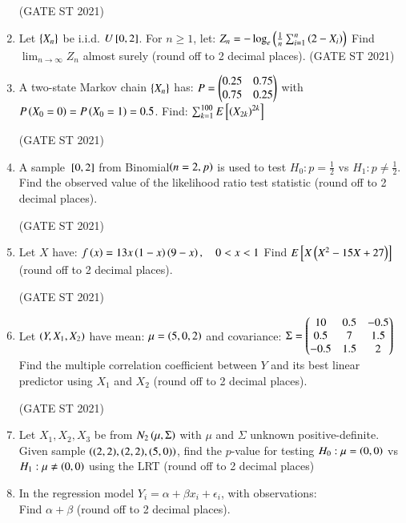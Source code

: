 \documentclass[journal,12pt,onecolumn]{IEEEtran}
\theoremstyle{remark}
\begin{document}
\begin{enumerate}
\hfill (GATE ST 2021) \\

\item
Let $\left\{X_n\right\}$ be i.i.d. $U{}\left[0,2\right]$. For $n \ge 1$, let:
$
Z_n = - \log_e \left( \frac{1}{n} \sum_{i=1}^n \left(2 - X_i\right) \right)
$
Find $\lim_{n \to \infty} Z_n$ almost surely (round off to 2 decimal places).
\hfill (GATE ST 2021) \\

\item
A two-state Markov chain $\left\{X_n\right\}$ has:
$
P = \begin{pmatrix} 0.25 & 0.75 \\ 0.75 & 0.25 \end{pmatrix}
$
with $P\left(X_0 = 0\right) = P\left(X_0 = 1\right) = 0.5$. Find:
$
\sum_{k=1}^{100} E{}\left[\left(X_{2k}\right)^{2k}\right]
$

\hfill (GATE ST 2021) \\

\item
A sample ${}\left[0,2\right]$ from Binomial$\left(n=2,p\right)$ is used to test $H_0: p = \frac12$ vs $H_1: p \ne \frac12$.  
Find the observed value of the likelihood ratio test statistic (round off to 2 decimal places).

\hfill (GATE ST 2021) \\

\item
Let $X$ have:
$
f\left(x\right) = 13x\left(1-x\right)\left(9-x\right), \quad 0 < x < 1
$
Find $E{}\left[ X\left(X^2 - 15X + 27\right)\right]$ (round off to 2 decimal places).

\hfill (GATE ST 2021) \\

\item
Let $\left(Y, X_1, X_2\right)$ have mean:
$
\mu = \left(5,0,2\right)
$
and covariance:
$
\Sigma =
\begin{pmatrix}
10 & 0.5 & -0.5 \\
0.5 & 7 & 1.5 \\
-0.5 & 1.5 & 2\end{pmatrix}
$
Find the multiple correlation coefficient between $Y$ and its best linear predictor using $X_1$ and $X_2$ (round off to 2 decimal places).

\hfill (GATE ST 2021) \\

\item
Let $X_1, X_2, X_3$ be from $N_2\left(\mu, \Sigma\right)$ with $\mu$ and $\Sigma$ unknown positive-definite.  
Given sample $\left((2,2), (2,2), (5,0)\right)$, find the $p$-value for testing $H_0: \mu = \left(0,0\right)$ vs $H_1: \mu \neq \left(0,0\right)$ using the LRT (round off to 2 decimal places)

\item
In the regression model $Y_i = \alpha + \beta x_i + \epsilon_i$,  
with observations: \\
 
\bigskip
Find $\alpha + \beta$ (round off to 2 decimal places).


\end{enumerate}
\end{document}
